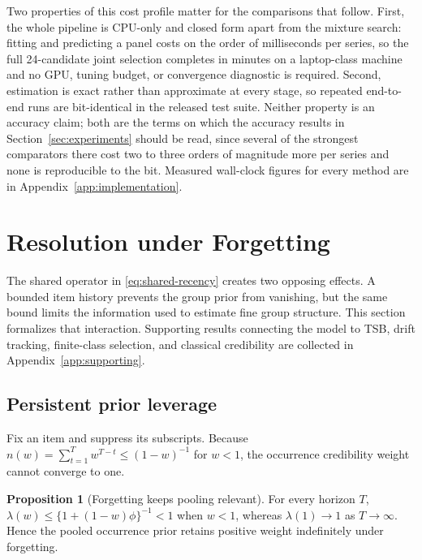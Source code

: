 \documentclass[twocolumn,10pt]{article}
\theoremstyle{definition}
\newtheorem{proposition}{Proposition}
\begin{document}
Two properties of this cost profile matter for the comparisons that
follow. First, the whole pipeline is CPU-only and closed form apart from
the mixture search: fitting and predicting a panel costs on the order of
milliseconds per series, so the full 24-candidate joint selection
completes in minutes on a laptop-class machine and no GPU, tuning budget,
or convergence diagnostic is required. Second, estimation is exact rather
than approximate at every stage, so repeated end-to-end runs are
bit-identical in the released test suite. Neither property is an accuracy
claim; both are the terms on which the accuracy results in
Section~\ref{sec:experiments} should be read, since several of the
strongest comparators there cost two to three orders of magnitude more per
series and none is reproducible to the bit. Measured wall-clock figures
for every method are in Appendix~\ref{app:implementation}.

\section{Resolution under Forgetting}\label{sec:theory}

The shared operator in \eqref{eq:shared-recency} creates two opposing
effects. A bounded item history prevents the group prior from vanishing,
but the same bound limits the information used to estimate fine group
structure. This section formalizes that interaction. Supporting results
connecting the model to TSB, drift tracking, finite-class selection, and
classical credibility are collected in Appendix~\ref{app:supporting}.

\subsection{Persistent prior leverage}

Fix an item and suppress its subscripts. Because
$n(w)=\sum_{t=1}^{T}w^{T-t}\le(1-w)^{-1}$ for $w<1$, the occurrence
credibility weight cannot converge to one.

\begin{proposition}[Forgetting keeps pooling relevant]
\label{prop:active}
For every horizon $T$,
$\lambda(w)\le\{1+(1-w)\phi\}^{-1}<1$ when $w<1$, whereas
$\lambda(1)\to1$ as $T\to\infty$. Hence the pooled occurrence prior
retains positive weight indefinitely under forgetting.
\end{proposition}
\end{document}
